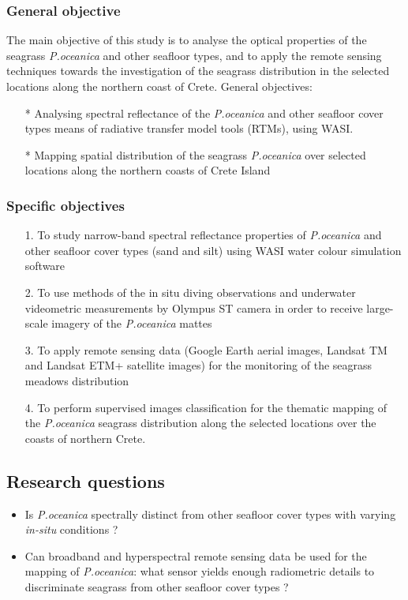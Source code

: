 \documentclass[11pt]{article}
\begin{document}
\subsubsection{General objective}
The main objective of this study is to analyse the optical properties of the seagrass \textit{P.oceanica} and other seafloor types, and to apply the remote sensing techniques towards the investigation of the seagrass distribution in the selected locations along the northern coast of Crete.
General objectives:
	\begin{itemize}
		\item[*]Analysing spectral reflectance of the \textit{P.oceanica} and other seafloor cover types means of radiative transfer model tools (\ac{RTM}s), using \ac{WASI}.
		\item[*]Mapping spatial distribution of the seagrass \textit{P.oceanica} over selected locations along the northern coasts of Crete Island 
	\end{itemize}

\subsubsection{Specific objectives}
	\begin{itemize}	
		\item[]1.	To study narrow-band spectral reflectance properties of \textit{P.oceanica} and other seafloor cover types (sand and silt) using \ac{WASI} water colour simulation software 
		\item[]2.	To use methods of the in situ diving observations and underwater videometric measurements by \ac{Olympus ST} camera in order to receive large-scale imagery of the \textit{P.oceanica} mattes 
		\item[]3.	To apply remote sensing data (Google Earth aerial images, \ac{Landsat TM} and \ac{Landsat ETM+} satellite images) for the monitoring of the seagrass meadows distribution 
		\item[]4.	To perform supervised images classification for the thematic mapping of the \textit{P.oceanica} seagrass distribution along the selected locations over the coasts of northern Crete. 
	\end{itemize}
\pagebreak

\subsection{Research questions}
	\begin{itemize}	
		\item Is \textit{P.oceanica} spectrally distinct from other seafloor cover types with varying \textit{in-situ} conditions ?
		\item Can broadband and hyperspectral remote sensing data be used for the mapping of \textit{P.oceanica}: what sensor yields enough radiometric details to discriminate seagrass from other seafloor cover types ?
	\end{itemize}
\end{document}
